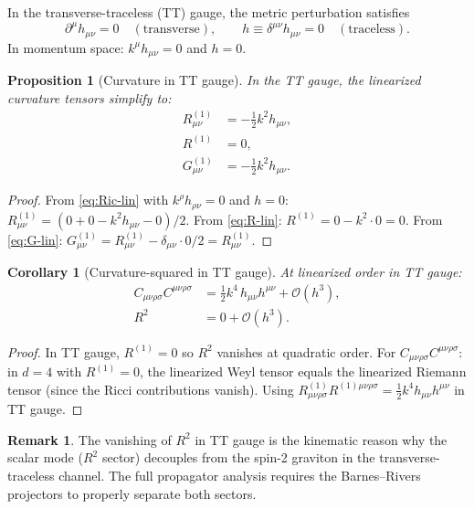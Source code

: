 \documentclass[11pt,a4paper]{article}
\newcommand{\Weylsq}{C_{\mu\nu\rho\sigma}C^{\mu\nu\rho\sigma}}
\theoremstyle{plain}
\newtheorem{proposition}[theorem]{Proposition}
\newtheorem{corollary}[theorem]{Corollary}
\theoremstyle{definition}
\newtheorem{remark}[theorem]{Remark}
\begin{document}
In the transverse-traceless (TT) gauge, the metric perturbation satisfies
\begin{equation}\label{eq:TT-gauge}
  \partial^\mu h_{\mu\nu} = 0 \quad (\text{transverse}),
  \qquad h \equiv \delta^{\mu\nu}h_{\mu\nu} = 0 \quad (\text{traceless}).
\end{equation}
In momentum space: $k^\mu h_{\mu\nu} = 0$ and $h = 0$.

\begin{proposition}[Curvature in TT gauge]\label{prop:TT-curv}
In the TT gauge, the linearized curvature tensors simplify to:
\begin{align}
  R^{(1)}_{\mu\nu} &= -\frac{1}{2}k^2 h_{\mu\nu},
  \label{eq:Ric-TT}\\
  R^{(1)} &= 0,
  \label{eq:R-TT}\\
  G^{(1)}_{\mu\nu} &= -\frac{1}{2}k^2 h_{\mu\nu}.
  \label{eq:G-TT}
\end{align}
\end{proposition}

\begin{proof}
From \cref{eq:Ric-lin} with $k^\rho h_{\rho\nu} = 0$ and $h = 0$:
$R^{(1)}_{\mu\nu} = (0 + 0 - k^2 h_{\mu\nu} - 0)/2$.
From \cref{eq:R-lin}: $R^{(1)} = 0 - k^2 \cdot 0 = 0$.
From \cref{eq:G-lin}: $G^{(1)}_{\mu\nu} = R^{(1)}_{\mu\nu}
- \delta_{\mu\nu} \cdot 0/2 = R^{(1)}_{\mu\nu}$.
\end{proof}

\begin{corollary}[Curvature-squared in TT gauge]\label{cor:curv-sq-TT}
At linearized order in TT gauge:
\begin{align}
  \Weylsq &= \frac{1}{2}k^4\, h_{\mu\nu}h^{\mu\nu}
  + \mathcal{O}(h^3),
  \label{eq:C2-TT}\\
  R^2 &= 0 + \mathcal{O}(h^3).
  \label{eq:R2-TT}
\end{align}
\end{corollary}

\begin{proof}
In TT gauge, $R^{(1)} = 0$ so $R^2$ vanishes at quadratic order.
For $\Weylsq$: in $d = 4$ with $R^{(1)} = 0$, the linearized Weyl
tensor equals the linearized Riemann tensor (since the Ricci
contributions vanish). Using
$R^{(1)}_{\mu\nu\rho\sigma}R^{(1)\mu\nu\rho\sigma}
= \frac{1}{2}k^4 h_{\mu\nu}h^{\mu\nu}$ in TT gauge.
\end{proof}

\begin{remark}
The vanishing of $R^2$ in TT gauge is the kinematic reason why the
scalar mode ($R^2$ sector) decouples from the spin-2 graviton in
the transverse-traceless channel. The full propagator analysis
requires the Barnes--Rivers projectors to properly separate both
sectors.
\end{remark}
\end{document}
